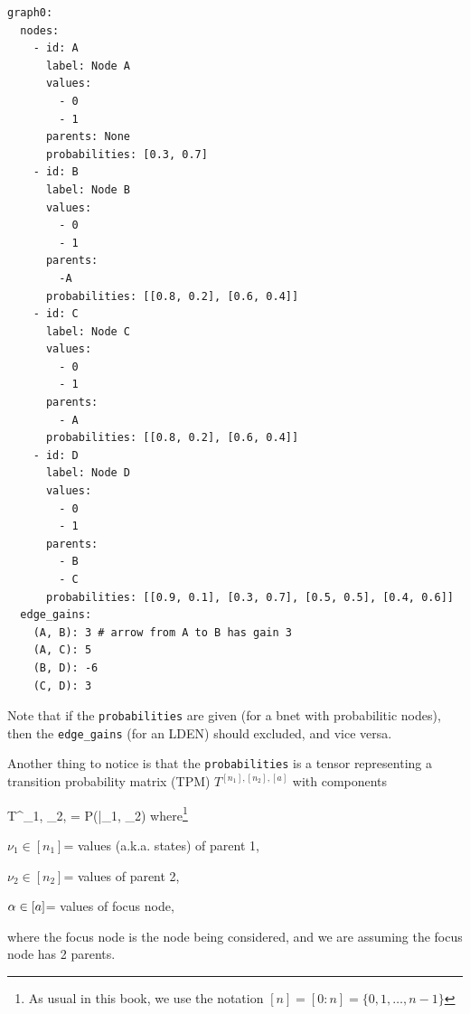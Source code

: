 \begin{mdframed}[hidealllines=true,backgroundcolor=blue!10]
\begin{verbatim}
graph0:
  nodes:
    - id: A
      label: Node A
      values: 
        - 0 
        - 1
      parents: None
      probabilities: [0.3, 0.7]
    - id: B
      label: Node B
      values: 
        - 0 
        - 1
      parents:
        -A
      probabilities: [[0.8, 0.2], [0.6, 0.4]]
    - id: C
      label: Node C
      values:
        - 0
        - 1
      parents: 
        - A   
      probabilities: [[0.8, 0.2], [0.6, 0.4]]
    - id: D
      label: Node D
      values:
        - 0
        - 1
      parents: 
        - B
        - C
      probabilities: [[0.9, 0.1], [0.3, 0.7], [0.5, 0.5], [0.4, 0.6]]
  edge_gains:
    (A, B): 3 # arrow from A to B has gain 3
    (A, C): 5
    (B, D): -6
    (C, D): 3
\end{verbatim}
\end{mdframed}

Note that if the 
{\tt probabilities}
are given (for a bnet with 
probabilitic nodes), then
the {\tt edge\_gains} (for an LDEN) should
excluded, and vice versa.


Another thing to notice
is that the {\tt probabilities} is a tensor
representing a transition probability matrix (TPM)
$T^{[n_1], [n_2], [a]}$
with components

\beq
 T^{\nu_1, \nu_2, \alp}= P(\alp|\nu_1, \nu_2)
 \eeq
where\footnote{As usual in this book, we use the notation $[n]=[0:n]=\{0, 1, \ldots, n-1\}$}

$\nu_1\in[n_1]$= values (a.k.a. states) of parent 1,

$\nu_2\in[n_2]$= values of parent 2, 

$\alpha\in[a]$= values of focus node,

where the focus node is the node
being considered, and we are assuming the focus node has 2 parents.
